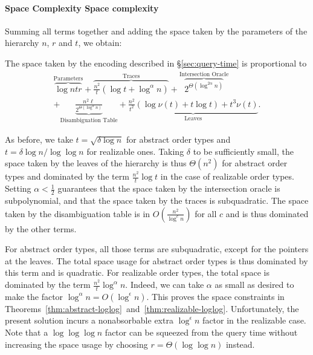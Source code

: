 \paragraph*{\iftitlecase%
Space Complexity\else%
Space complexity\fi}
Summing all terms together and adding the space taken by the
parameters of the hierarchy \(n\), \(r\) and \(t\), we obtain:
\begin{lemma}\label{lem:space-2-all-query}
  The space taken by the encoding described in \S\ref{sec:query-time} is
  proportional to
    \begin{multline*}
    \overbrace{\log ntr}^{\text{Parameters}}
    +
    \overbrace{\frac{n^2}{t} (\log t + \log^{\alpha} n)}^{\text{Traces}}
    +
    \overbrace{2^{\Theta(\log^{2\alpha} n)}}^{\text{Intersection Oracle}}\\
    +
    \underbrace{\frac{n^2 \ell}{2^{\Theta(\log^{\alpha} n)}}}_{\text{Disambiguation Table}}
    +
    \underbrace{\frac{n^2}{t^2} ( \log \nu(t) + t \log t) + t^3 \nu(t)}_{\text{Leaves}}.
    \end{multline*}
\end{lemma}
As before,
we take \(t = \sqrt{\delta \log n}\) for abstract order types and \(t = \delta
\log n / \log\log n\) for realizable ones.
Taking \(\delta\) to be sufficiently small,
the space taken by the leaves of the hierarchy is thus \(\Theta(n^2)\) for
abstract order types and dominated by the term \(\frac{n^2}{t} \log t\)
in the case of realizable order types.
%
Setting \(\alpha < \frac 12\)
guarantees
that the space taken by the intersection oracle is subpolynomial,
and
that the space taken by the traces is subquadratic.
%
The space taken by the
disambiguation table is in \(O(\frac{n^2}{\log^c n})\) for all \(c\) and is
thus dominated by the other terms.

For abstract order types, all those terms are subquadratic, except for the
pointers at the leaves. The total space
usage for abstract order types is thus dominated by this term and
is quadratic.
%
For realizable order types, the total space is dominated by the term
\(\frac{n^2}{t} \log^{\alpha} n\).
Indeed, we can take \(\alpha\) as small as desired
to make the factor \(\log^{\alpha} n = O(\log^{\epsilon} n)\).
%
This proves the space constraints in
Theorems~\ref{thm:abstract-loglog}~and~\ref{thm:realizable-loglog}.
%
Unfortunately, the present solution incurs a nonabsorbable
extra \(\log^{\epsilon} n\) factor in the realizable case. Note that a
\(\log{\log{\log{n}}}\) factor can be squeezed from the query time without
increasing the space usage by choosing \(r = \Theta(\log \log n)\) instead.


